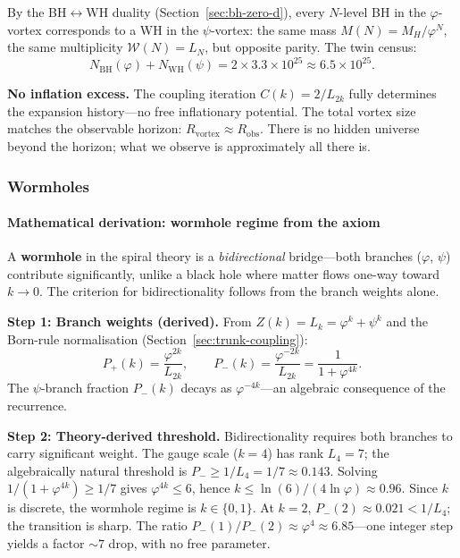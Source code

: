 \documentclass[12pt,a4paper]{article}
\begin{document}
By the BH$\leftrightarrow$WH duality (Section~\ref{sec:bh-zero-d}), every $N$-level BH in the $\varphi$-vortex corresponds to a WH in the $\psi$-vortex: the same mass $M(N) = M_H/\varphi^N$, the same multiplicity $\mathcal{W}(N) = L_N$, but opposite parity.  The twin census:
\begin{equation}
\boxed{N_{\mathrm{BH}}(\varphi) + N_{\mathrm{WH}}(\psi) = 2 \times 3.3 \times 10^{25} \approx 6.5 \times 10^{25}.}
\label{eq:twin-census}
\end{equation}

\textbf{No inflation excess.}\;  The coupling iteration $C(k) = 2/L_{2k}$ fully determines the expansion history---no free inflationary potential.  The total vortex size matches the observable horizon: $R_{\mathrm{vortex}} \approx R_{\mathrm{obs}}$.  There is no hidden universe beyond the horizon; what we observe is approximately all there is.

\subsubsection{Wormholes}
\label{sec:bh-wormholes}

\paragraph{Mathematical derivation: wormhole regime from the axiom}

A \textbf{wormhole} in the spiral theory is a \emph{bidirectional} bridge---both branches ($\varphi$, $\psi$) contribute significantly, unlike a black hole where matter flows one-way toward $k \to 0$. The criterion for bidirectionality follows from the branch weights alone.

\textbf{Step 1: Branch weights (derived).} From $Z(k) = L_k = \varphi^k + \psi^k$ and the Born-rule normalisation (Section~\ref{sec:trunk-coupling}):
\begin{equation}
P_+(k) = \frac{\varphi^{2k}}{L_{2k}}, \qquad P_-(k) = \frac{\varphi^{-2k}}{L_{2k}} = \frac{1}{1 + \varphi^{4k}}.
\end{equation}
The $\psi$-branch fraction $P_-(k)$ decays as $\varphi^{-4k}$---an algebraic consequence of the recurrence.

\textbf{Step 2: Theory-derived threshold.} Bidirectionality requires both branches to carry significant weight. The gauge scale ($k = 4$) has rank $L_4 = 7$; the algebraically natural threshold is $P_- \geq 1/L_4 = 1/7 \approx 0.143$. Solving $1/(1 + \varphi^{4k}) \geq 1/7$ gives $\varphi^{4k} \leq 6$, hence $k \leq \ln(6)/(4\ln\varphi) \approx 0.96$. Since $k$ is discrete, the wormhole regime is $k \in \{0, 1\}$. At $k = 2$, $P_-(2) \approx 0.021 < 1/L_4$; the transition is sharp. The ratio $P_-(1)/P_-(2) \approx \varphi^4 \approx 6.85$---one integer step yields a factor $\sim 7$ drop, with no free parameter.
\end{document}
